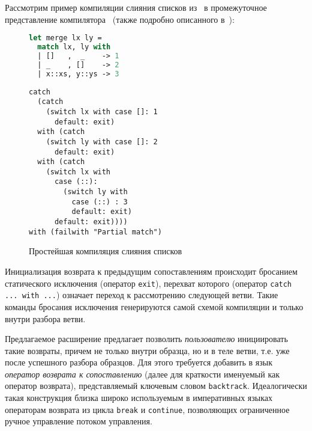 Рассмотрим пример компиляции слияния списков из~\cite{fessant2001optimizing} в промежуточное представление компилятора \ocaml~(также подробно описанного в~\cite{fessant2001optimizing}):

\noindent
\begin{minipage}{\textwidth}
  \begin{figure}[H]
    \begin{minipage}{0.40\textwidth}
\begin{lstlisting}[language=ocaml]
let merge lx ly = 
  match lx, ly with
  | []   ,  _    -> 1
  | _    , []    -> 2
  | x::xs, y::ys -> 3
\end{lstlisting}
    \end{minipage}
  \centering
    \begin{minipage}{0.55\textwidth}
\begin{lstlisting}[language=lambda]
catch
  (catch
    (switch lx with case []: 1
      default: exit)
  with (catch
    (switch ly with case []: 2
      default: exit)
  with (catch
    (switch lx with
      case (::):
        (switch ly with
          case (::) : 3
          default: exit)
      default: exit))))
with (failwith "Partial match")
\end{lstlisting}
    \end{minipage}
    
  \captionsetup{justification=centering}
  \caption{Простейшая компиляция слияния списков}
  \label{fig:simple_match}
  \end{figure}
\end{minipage}

\bigskip

Инициализация возврата к предыдущим сопоставлениям происходит бросанием статического исключения (оператор \lstinline|exit|), перехват которого (оператор \lstinline[language=none,breaklines]|catch ... with ...|) означает переход к рассмотрению следующей ветви. Такие команды бросания исключения генерируются самой схемой компиляции и только внутри разбора ветви.

Предлагаемое расширение предлагает позволить \textit{пользователю} инициировать такие возвраты, причем не только внутри образца, но и в теле ветви, т.е. уже после успешного разбора образцов. Для этого требуется добавить в язык \textit{оператор возврата к сопоставлению} (далее для краткости именуемый как оператор возврата), представляемый ключевым словом \lstinline|backtrack|. Идеалогически такая конструкция близка широко используемым в императивных языках операторам возврата из цикла \lstinline|break| и \lstinline|continue|, позволяющих ограниченное ручное управление потоком управления. 

